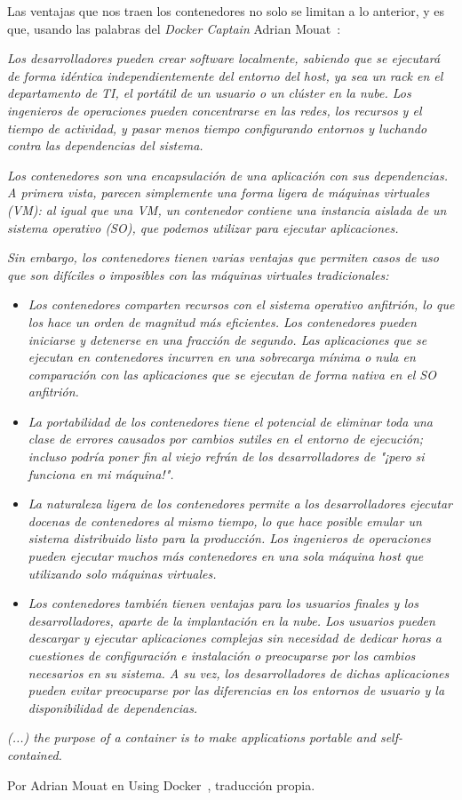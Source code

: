 Las ventajas que nos traen los contenedores no solo se limitan a lo anterior, y es que, usando las palabras del \textit{Docker Captain} Adrian Mouat~\cite{dockerAdrianMouat}:


\begin{displayquote}
{\it Los desarrolladores pueden crear software localmente, sabiendo que se ejecutará de forma idéntica independientemente del entorno del host, ya sea un rack en el departamento de TI, el portátil de un usuario o un clúster en la nube. Los ingenieros de operaciones pueden concentrarse en las redes, los recursos y el tiempo de actividad, y pasar menos tiempo configurando entornos y luchando contra las dependencias del sistema. }

{\it Los contenedores son una encapsulación de una aplicación con sus dependencias. A primera vista, parecen simplemente una forma ligera de máquinas virtuales (VM): al igual que una VM, un contenedor contiene una instancia aislada de un sistema operativo (SO), que podemos utilizar para ejecutar aplicaciones. }

{\it Sin embargo, los contenedores tienen varias ventajas que permiten casos de uso que son difíciles o imposibles con las máquinas virtuales tradicionales: }
\begin{itemize}
    \item {\it Los contenedores comparten recursos con el sistema operativo anfitrión, lo que los hace un orden de magnitud más eficientes. Los contenedores pueden iniciarse y detenerse en una fracción de segundo. Las aplicaciones que se ejecutan en contenedores incurren en una sobrecarga mínima o nula en comparación con las aplicaciones que se ejecutan de forma nativa en el SO anfitrión.}
    \item {\it La portabilidad de los contenedores tiene el potencial de eliminar toda una clase de errores causados por cambios sutiles en el entorno de ejecución; incluso podría poner fin al viejo refrán de los desarrolladores de "¡pero si funciona en mi máquina!".}
    \item {\it La naturaleza ligera de los contenedores permite a los desarrolladores ejecutar docenas de contenedores al mismo tiempo, lo que hace posible emular un sistema distribuido listo para la producción. Los ingenieros de operaciones pueden ejecutar muchos más contenedores en una sola máquina host que utilizando solo máquinas virtuales.}
    \item {\it Los contenedores también tienen ventajas para los usuarios finales y los desarrolladores, aparte de la implantación en la nube. Los usuarios pueden descargar y ejecutar aplicaciones complejas sin necesidad de dedicar horas a cuestiones de configuración e instalación o preocuparse por los cambios necesarios en su sistema. A su vez, los desarrolladores de dichas aplicaciones pueden evitar preocuparse por las diferencias en los entornos de usuario y la disponibilidad de dependencias.}
\end{itemize}


{\it (...) the purpose of a container is to make applications portable and self-contained. }
\end{displayquote}
Por  Adrian Mouat en Using Docker~\cite{Mouat2015-uh}, traducción propia.


